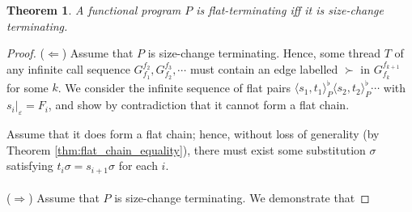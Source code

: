 \documentclass{article}
\newtheorem{theorem}{Theorem}%
\theoremstyle{definition}
\newtheorem{definition}[theorem]{Definition}
\begin{document}
\begin{theorem}
    A functional program $P$ is flat-terminating iff it is size-change terminating.
\end{theorem}

\begin{proof}
    ($\Leftarrow$) Assume that $P$ is size-change terminating. Hence, some thread $T$ of any infinite call sequence $G_{f_1}^{f_2}, G_{f_2}^{f_3}, \cdots$ must contain an edge labelled $\succ$ in $G_{f_k}^{f_{k+1}}$ for some $k$. We consider the infinite sequence of flat pairs $\langle s_1, t_1 \rangle_P^\flat \langle s_2, t_2\rangle_P^\flat \cdots$ with $s_i|_\varepsilon = F_i$, and show by contradiction that it cannot form a flat chain. 
    
    Assume that it does form a flat chain; hence, without loss of generality (by Theorem \ref{thm:flat_chain_equality}), there must exist some substitution $\sigma$ satisfying $t_i \sigma = s_{i+1}\sigma$ for each $i$. 
    \\~\\
    ($\Rightarrow$) Assume that $P$ is size-change terminating. We demonstrate that 
\end{proof}




\end{document}
